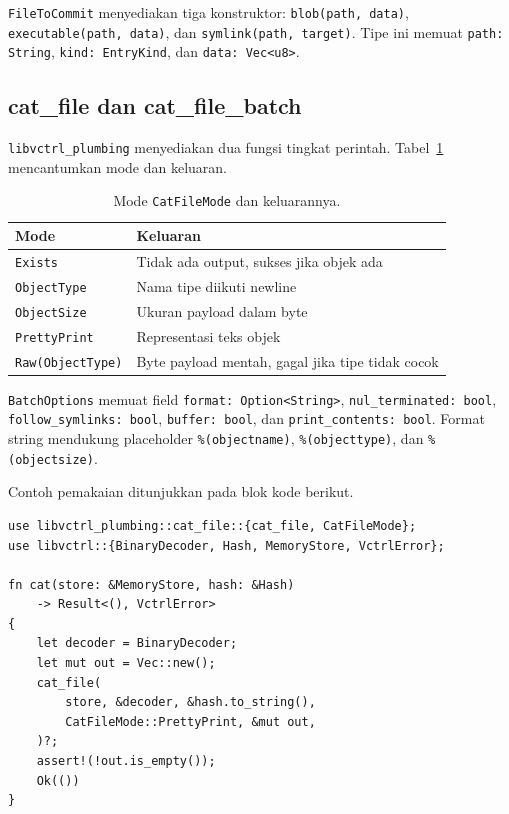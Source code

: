 \documentclass[11pt,a4paper]{article}
\begin{document}
\texttt{FileToCommit} menyediakan tiga konstruktor: \texttt{blob(path, data)}, \texttt{executable(path, data)}, dan \texttt{symlink(path, target)}. Tipe ini memuat \texttt{path: String}, \texttt{kind: EntryKind}, dan \texttt{data: Vec<u8>}.

\subsection{cat\_file dan cat\_file\_batch}

\texttt{libvctrl\_plumbing} menyediakan dua fungsi tingkat perintah. Tabel~\ref{tab:catfile} mencantumkan mode dan keluaran.

\begin{table}[H]
	\centering
	\caption{Mode \texttt{CatFileMode} dan keluarannya.}
	\label{tab:catfile}
	\footnotesize
	\begin{tabularx}{\textwidth}{l X}
		\toprule
		Mode & Keluaran \\
		\midrule
		\texttt{Exists} & Tidak ada output, sukses jika objek ada \\
		\texttt{ObjectType} & Nama tipe diikuti newline \\
		\texttt{ObjectSize} & Ukuran payload dalam byte \\
		\texttt{PrettyPrint} & Representasi teks objek \\
		\texttt{Raw(ObjectType)} & Byte payload mentah, gagal jika tipe tidak cocok \\
		\bottomrule
	\end{tabularx}
\end{table}

\texttt{BatchOptions} memuat field \texttt{format: Option<String>}, \texttt{nul\_terminated: bool}, \texttt{follow\_symlinks: bool}, \texttt{buffer: bool}, dan \texttt{print\_contents: bool}. Format string mendukung placeholder \texttt{\%(objectname)}, \texttt{\%(objecttype)}, dan \texttt{\%(objectsize)}.

Contoh pemakaian ditunjukkan pada blok kode berikut.

\begin{lstlisting}[style=code]
use libvctrl_plumbing::cat_file::{cat_file, CatFileMode};
use libvctrl::{BinaryDecoder, Hash, MemoryStore, VctrlError};

fn cat(store: &MemoryStore, hash: &Hash)
    -> Result<(), VctrlError>
{
    let decoder = BinaryDecoder;
    let mut out = Vec::new();
    cat_file(
        store, &decoder, &hash.to_string(),
        CatFileMode::PrettyPrint, &mut out,
    )?;
    assert!(!out.is_empty());
    Ok(())
}
\end{lstlisting}
\end{document}
